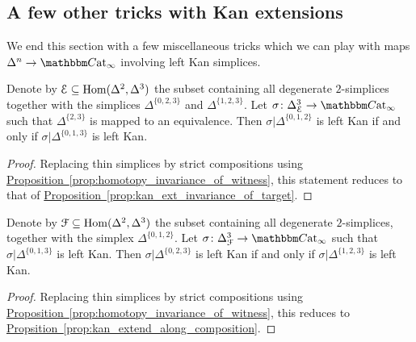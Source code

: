 \documentclass[main.tex]{subfiles}
\begin{document}
\subsection{A few other tricks with Kan extensions}
\label{ssc:a_few_other_tricks_with_kan_extensions}

We end this section with a few miscellaneous tricks which we can play with maps $\Delta^{n} \to \ICCat$ involving left Kan simplices.

\begin{lemma}
  \label{lemma:transport_left_kan_simplices}
  Denote by $\mathcal{E} \subseteq \mathrm{Hom}(\Delta^{2}, \Delta^{3})$ the subset containing all degenerate $2$-simplices together with the simplices $\Delta^{\{0,2,3\}}$ and $\Delta^{\{1,2,3\}}$. Let $\sigma\colon \Delta^{3}_{\mathcal{E}} \to \ICCat$ such that $\Delta^{\{2,3\}}$ is mapped to an equivalence. Then $\sigma|\Delta^{\{0,1,2\}}$ is left Kan if and only if $\sigma|\Delta^{\{0,1,3\}}$ is left Kan.
\end{lemma}
\begin{proof}
  Replacing thin simplices by strict compositions using \hyperref[prop:homotopy_invariance_of_witness]{Proposition~\ref*{prop:homotopy_invariance_of_witness}}, this statement reduces to that of \hyperref[prop:kan_ext_invariance_of_target]{Proposition~\ref*{prop:kan_ext_invariance_of_target}}.
\end{proof}

\begin{lemma}
  \label{lemma:compose_left_kan_simplices}
  Denote by $\mathcal{F} \subseteq \mathrm{Hom}(\Delta^{2}, \Delta^{3})$ the subset containing all degenerate $2$-simplices, together with the simplex $\Delta^{\{0,1,2\}}$. Let $\sigma\colon \Delta^{3}_{\mathcal{F}} \to \ICCat$ such that $\sigma|\Delta^{\{0,1,3\}}$ is left Kan. Then $\sigma|\Delta^{\{0,2,3\}}$ is left Kan if and only if $\sigma|\Delta^{\{1,2,3\}}$ is left Kan.
\end{lemma}
\begin{proof}
  Replacing thin simplices by strict compositions using \hyperref[prop:homotopy_invariance_of_witness]{Proposition~\ref*{prop:homotopy_invariance_of_witness}}, this reduces to \hyperref[prop:kan_extend_along_composition]{Propsition~\ref*{prop:kan_extend_along_composition}}.
\end{proof}
\end{document}
